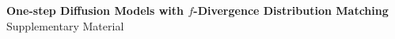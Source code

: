 \clearpage

\onecolumn
{

    \centering
    \Large
    \textbf{One-step Diffusion Models with $f$-Divergence Distribution Matching}\\
    \vspace{0.5em}Supplementary Material \\
    \vspace{1.0em}
}

\appendix









